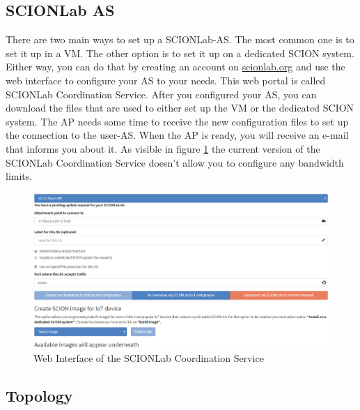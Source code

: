 \subsection{SCIONLab AS}
There are two main ways to set up a \acs{SCIONLab}-\acs{AS}. The most common one is to set it up in a \acs{VM}. The other option is to set it up on a dedicated \acs{SCION} system. Either way, you can do that by creating an account on \href{https://www.scionlab.org}{scionlab.org} and use the web interface to configure your \acs{AS} to your needs. This web portal is called \acs{SCIONLab} Coordination Service. After you configured your \acs{AS}, you can download the files that are used to either set up the \acs{VM} or the dedicated \acs{SCION} system. The \acl{AP} needs some time to receive the new configuration files to set up the connection to the user-\acs{AS}. When the \acs{AP} is ready, you will receive an e-mail that informs you about it. As visible in figure \ref{SCIONLab Coordination Service} the current version of the \acs{SCIONLab} Coordination Service doesn't allow you to configure any bandwidth limits.

\begin{figure}[h]
	\centering
	\includegraphics[width=\textwidth]{img/SCIONLab_Coordination_Service.png}
	\caption{Web Interface of the SCIONLab Coordination Service }
	\label{SCIONLab Coordination Service}
\end{figure}

\subsection{Topology}
